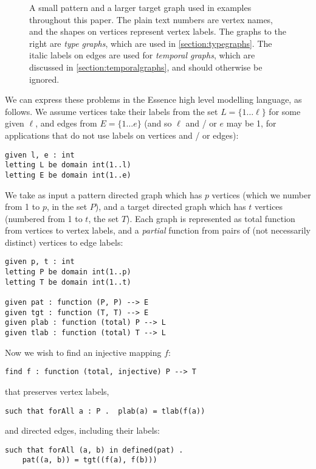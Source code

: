 \documentclass[runningheads]{llncs}
\begin{document}
\begin{figure}[tb]
    \caption{A small pattern and a larger target graph used in examples throughout this paper. The
    plain text numbers are vertex names, and the shapes on vertices represent vertex labels. The
    graphs to the right are \emph{type graphs}, which are used in \cref{section:typegraphs}. The
    italic labels on edges are used for \emph{temporal graphs}, which are discussed in
    \cref{section:temporalgraphs}, and should otherwise be ignored.}
    \label{figure:littlegraphs}
\end{figure}

We can express these problems in the Essence high level modelling language, as follows. We assume
vertices take their labels from the set $L = \{ 1\ldots\ell \}$ for some given $\ell$, and edges
from $E = \{ 1\ldots{}e \}$ (and so $\ell$ and / or $e$ may be 1, for applications that do not use
labels on vertices and / or edges):
\begin{lstlisting}
given l, e : int
letting L be domain int(1..l)
letting E be domain int(1..e)
\end{lstlisting}
We take as input a pattern directed graph which has $p$ vertices (which we number from 1 to $p$, in
the set $P$), and a target directed graph which has $t$ vertices (numbered from 1 to $t$, the set
$T$). Each graph is represented as total function from vertices to vertex labels, and a
\emph{partial} function from pairs of (not necessarily distinct) vertices to edge labels:
\begin{lstlisting}
given p, t : int
letting P be domain int(1..p)
letting T be domain int(1..t)

given pat : function (P, P) --> E
given tgt : function (T, T) --> E
given plab : function (total) P --> L
given tlab : function (total) T --> L
\end{lstlisting}
Now we wish to find an injective mapping $f$:
\begin{lstlisting}
find f : function (total, injective) P --> T
\end{lstlisting}
that preserves vertex labels,
\begin{lstlisting}
such that forAll a : P .  plab(a) = tlab(f(a))
\end{lstlisting}
and directed edges, including their labels:
\begin{lstlisting}
such that forAll (a, b) in defined(pat) .
    pat((a, b)) = tgt((f(a), f(b)))
\end{lstlisting}
\end{document}
